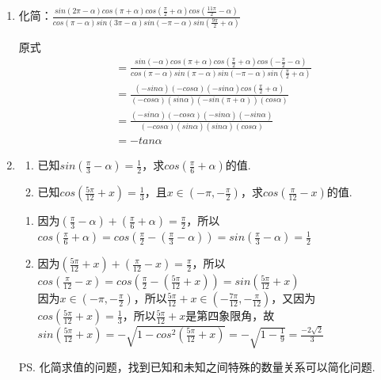 \begin{enumerate}
    \item 化简：$\frac{sin(2\pi - \alpha) cos(\pi + \alpha)cos(\frac{\pi}{2}+\alpha)cos(\frac{11\pi}{2}-\alpha)}{cos(\pi - \alpha)sin(3\pi-\alpha)sin(-\pi-\alpha)sin(\frac{9\pi}{2}+\alpha)}$
        \begin{jieda}
            原式 \begin{align*}
                & = \frac{sin(-\alpha) cos(\pi + \alpha)cos(\frac{\pi}{2}+\alpha)cos(-\frac{\pi}{2}-\alpha)}{cos(\pi - \alpha)sin(\pi-\alpha)sin(-\pi-\alpha)sin(\frac{\pi}{2}+\alpha)} \\
            & = \frac{(-sin\alpha) (-cos\alpha) (-sin\alpha)cos(\frac{\pi}{2} + \alpha)}{(-cos\alpha)(sin\alpha)(-sin(\pi+\alpha))(cos\alpha)} \\
            & = \frac{(-sin\alpha) (-cos\alpha) (-sin\alpha)(-sin\alpha)}{(-cos\alpha)(sin\alpha)(sin\alpha)(cos\alpha)} \\ & = -tan\alpha
            \end{align*}
        \end{jieda}
           
    \begin{vspace_}
    \vsp[5]
    \end{vspace_}
        \item \begin{enumerate}
            \item 已知$sin(\frac{\pi}{3}-\alpha) = \frac{1}{2}$，求$cos(\frac{\pi}{6} + \alpha)$的值.
            \item 已知$cos(\frac{5\pi}{12}+x) = \frac{1}{3}$，且$x \in (-\pi, -\frac{\pi}{2})$，求$cos(\frac{\pi}{12} - x)$的值.
        \end{enumerate}
        \begin{jieda}
            \begin{enumerate}
                \item 因为$(\frac{\pi}{3}-\alpha) + (\frac{\pi}{6} + \alpha) = \frac{\pi}{2}$，所以$cos(\frac{\pi}{6} + \alpha) = cos(\frac{\pi}{2} - (\frac{\pi}{3} - \alpha)) = sin(\frac{\pi}{3} - \alpha) = \frac{1}{2}$
                \item 因为$(\frac{5\pi}{12}+x) + (\frac{\pi}{12} - x) = \frac{\pi}{2}$，所以$cos(\frac{\pi}{12} - x) = cos(\frac{\pi}{2} - (\frac{5\pi}{12}+x)) = sin(\frac{5\pi}{12}+x)$ \\
                因为$x \in (-\pi, -\frac{\pi}{2})$，所以$\frac{5\pi}{12}+x \in (-\frac{7\pi}{12}, -\frac{\pi}{12})$，又因为$cos(\frac{5\pi}{12}+x) = \frac{1}{3}$，所以$\frac{5\pi}{12}+x$是第四象限角，故$sin(\frac{5\pi}{12}+x) = -\sqrt{1 - cos^2(\frac{5\pi}{12}+x)} = -\sqrt{1 - \frac{1}{9}} = \frac{-2\sqrt{2}}{3}$
            \end{enumerate}
            \ps 化简求值的问题，找到已知和未知之间特殊的数量关系可以简化问题.
        \end{jieda}
           

\end{enumerate}
